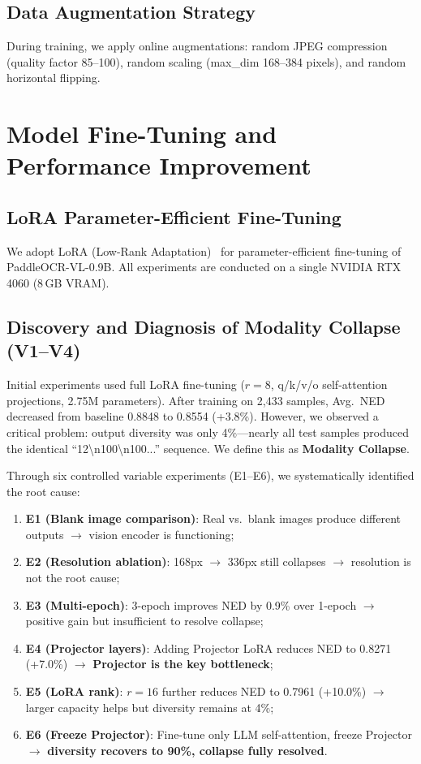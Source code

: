 \subsection{Data Augmentation Strategy}
During training, we apply online augmentations: random JPEG compression (quality factor 85--100), random scaling (max\_dim 168--384 pixels), and random horizontal flipping.


\section{Model Fine-Tuning and Performance Improvement}

\subsection{LoRA Parameter-Efficient Fine-Tuning}

We adopt LoRA (Low-Rank Adaptation)~\citep{hu2021lora} for parameter-efficient fine-tuning of PaddleOCR-VL-0.9B. All experiments are conducted on a single NVIDIA RTX 4060 (8\,GB VRAM).

\subsection{Discovery and Diagnosis of Modality Collapse (V1--V4)}

Initial experiments used full LoRA fine-tuning ($r=8$, q/k/v/o self-attention projections, 2.75M parameters). After training on 2,433 samples, Avg.\ NED decreased from baseline 0.8848 to 0.8554 (+3.8\%). However, we observed a critical problem: output diversity was only 4\%---nearly all test samples produced the identical ``12\textbackslash n100\textbackslash n100...'' sequence. We define this as \textbf{Modality Collapse}.

Through six controlled variable experiments (E1--E6), we systematically identified the root cause:

\begin{enumerate}[nosep]
    \item \textbf{E1 (Blank image comparison)}: Real vs.\ blank images produce different outputs $\to$ vision encoder is functioning;
    \item \textbf{E2 (Resolution ablation)}: 168px $\to$ 336px still collapses $\to$ resolution is not the root cause;
    \item \textbf{E3 (Multi-epoch)}: 3-epoch improves NED by 0.9\% over 1-epoch $\to$ positive gain but insufficient to resolve collapse;
    \item \textbf{E4 (Projector layers)}: Adding Projector LoRA reduces NED to 0.8271 (+7.0\%) $\to$ \textbf{Projector is the key bottleneck};
    \item \textbf{E5 (LoRA rank)}: $r=16$ further reduces NED to 0.7961 (+10.0\%) $\to$ larger capacity helps but diversity remains at 4\%;
    \item \textbf{E6 (Freeze Projector)}: Fine-tune only LLM self-attention, freeze Projector $\to$ \textbf{diversity recovers to 90\%, collapse fully resolved}.
\end{enumerate}

